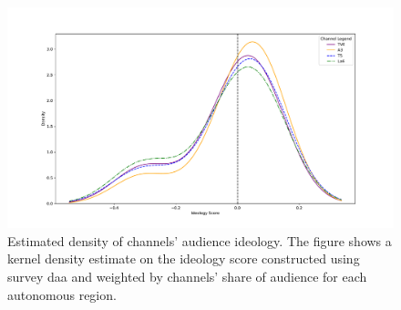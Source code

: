 \documentclass[12pt]{article}
\begin{document}
\begin{figure}[H]
	\centering
	\includegraphics[width=150mm]{figures/channel_ideology_density_python}
	\caption{Estimated density of channels' audience ideology. The figure shows a kernel density estimate on the ideology score constructed using survey daa and weighted by channels' share of audience for each autonomous region. }
	\label{fig:density}
\end{figure}
\end{document}
